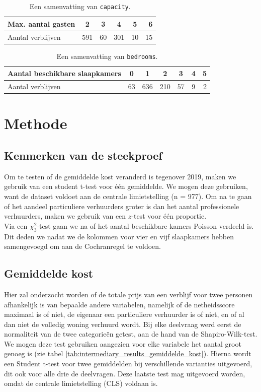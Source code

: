 \documentclass[a4paper]{kulakarticle}
\begin{document}
\begin{table}[h]
	\centering
	\begin{tabular}{|l|c|c|c|c|r|}
		\hline
		Max. aantal gasten&2&3&4&5&6\\[0.5ex]
		\hline
		Aantal verblijven&591&60 &301  &10  &15 \\[0.5ex]
		\hline
	\end{tabular}
	\cprotect\caption{Een samenvatting van \verb|capacity|.}
	\label{capacity tabel}
\end{table}

\begin{table}[h]
	\centering
	\begin{tabular}{|l|c|c|c|c|c|r|}
		\hline
		Aantal beschikbare slaapkamers&0&1&2&3&4&5\\[0.5ex]
		\hline
		Aantal verblijven&63 &636 &210   &57     &9     &2  \\[0.5ex]
		\hline
	\end{tabular}
	\cprotect\caption{Een samenvatting van \verb|bedrooms|.}
	\label{bedrooms tabel}
\end{table}


	
	\section{Methode}
	
	\subsection{Kenmerken van de steekproef}
	Om te testen of de gemiddelde kost veranderd is tegenover 2019, maken we gebruik van een student t-test voor één gemiddelde. We mogen deze gebruiken, want de dataset voldoet aan de centrale limietstelling (n = 977). Om na te gaan of het aandeel particuliere verhuurders groter is dan het aantal professionele verhuurders, maken we gebruik van een $z$-test voor één proportie.\\
	Via een $\chi^2_{3}$-test gaan we na of het aantal beschikbare kamers Poisson verdeeld is. Dit deden we nadat we de kolommen voor vier en vijf slaapkamers hebben samengevoegd om aan de Cochranregel te voldoen.
	
	\subsection{Gemiddelde kost}
	
	Hier zal onderzocht worden of de totale prijs van een verblijf voor twee personen afhankelijk is van bepaalde andere variabelen, namelijk of de netheidsscore maximaal is of niet, de eigenaar een particuliere verhuurder is of niet, en of al dan niet de volledig woning verhuurd wordt.
	Bij elke deelvraag werd eerst de normaliteit van de twee categorieën getest, aan de hand van de Shapiro-Wilk-test. We mogen deze test gebruiken aangezien voor elke variabele het aantal groot genoeg is (zie tabel \ref{tab:intermediary_results_gemiddelde_kost}). Hierna wordt een Student t-test voor twee gemiddelden bij verschillende varianties uitgevoerd, dit ook voor alle drie de deelvragen. Deze laatste test mag uitgevoerd worden, omdat de centrale limietstelling (CLS) voldaan is.
\end{document}
